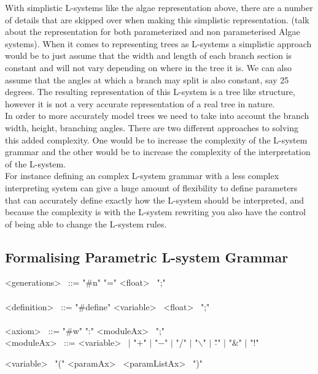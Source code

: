 With simplistic L-systems like the algae representation above, there are a number of details that are skipped over when making this simplistic representation. (talk about the representation for both parameterized and non parameterised Algae systems). When it comes to representing trees as L-systems a simplistic approach would be to just assume that the width and length of each branch section is constant and will not vary depending on where in the tree it is. We can also assume that the angles at which a branch may split is also constant, say 25 degrees. 
The resulting representation of this L-system is a tree like structure, however it is not a very accurate representation of a real tree in nature. \\
In order to more accurately model trees we need to take into account the branch width, height, branching angles. There are two different approaches to solving this added complexity. One would be to increase the complexity of the L-system grammar and the other would be to increase the complexity of the interpretation of the L-system. \\
For instance defining an complex L-system grammar with a less complex interpreting system can give a huge amount of flexibility to define parameters that can accurately define exactly how the L-system should be interpreted, and because the complexity is with the L-system rewriting you also have the control of being able to change the L-system rules. \\

\subsection{Formalising Parametric L-system Grammar}



\textless generations\textgreater~ ::= "\#n" "=" \textless float\textgreater~ ";" \\
\\
\textless definition\textgreater~ ::=  "\#define" \textless variable\textgreater~ \textless float\textgreater~ ";" \\
\\
\textless axiom\textgreater~ ::=  "\#w" ":" \textless moduleAx\textgreater~ ";" \\
\textless moduleAx\textgreater~  ::= \textless variable\textgreater~ $|$ "$+$" $|$ "$-$" $|$ "/" $|$ "$\backslash$" $|$ "$\hat{}$" $|$ "$\&$" $|$ "!" 

\hspace{1cm} \textless variable\textgreater~ "("  \textless paramAx\textgreater~ \textless paramListAx\textgreater~ ")"

